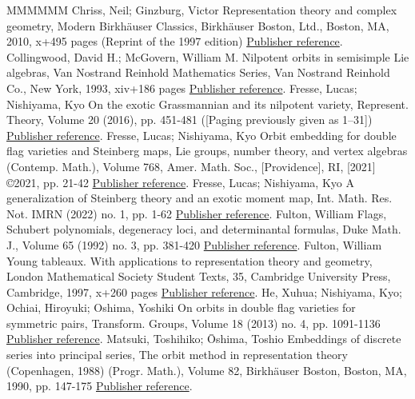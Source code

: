 \begin{thebibliography}{MMMMMM}
 Chriss, Neil; Ginzburg, Victor Representation theory and complex geometry, Modern Birkhäuser Classics, Birkhäuser Boston, Ltd., Boston, MA, 2010, x+495 pages (Reprint of the 1997 edition) \href{https://alco.centre-mersenne.org/articles/10.5802/alco.245/#CG}{Publisher reference}.
 Collingwood, David H.; McGovern, William M. Nilpotent orbits in semisimple Lie algebras, Van Nostrand Reinhold Mathematics Series, Van Nostrand Reinhold Co., New York, 1993, xiv+186 pages \href{https://alco.centre-mersenne.org/articles/10.5802/alco.245/#Collingwood-McGovern}{Publisher reference}.
 Fresse, Lucas; Nishiyama, Kyo On the exotic Grassmannian and its nilpotent variety, Represent. Theory, Volume 20 (2016), pp. 451-481 ([Paging previously given as 1–31]) \href{https://alco.centre-mersenne.org/articles/10.5802/alco.245/#FN1}{Publisher reference}.
 Fresse, Lucas; Nishiyama, Kyo Orbit embedding for double flag varieties and Steinberg maps, Lie groups, number theory, and vertex algebras (Contemp. Math.), Volume 768, Amer. Math. Soc., [Providence], RI, [2021] ©2021, pp. 21-42 \href{https://alco.centre-mersenne.org/articles/10.5802/alco.245/#FN3}{Publisher reference}.
 Fresse, Lucas; Nishiyama, Kyo A generalization of Steinberg theory and an exotic moment map, Int. Math. Res. Not. IMRN (2022) no. 1, pp. 1-62 \href{https://alco.centre-mersenne.org/articles/10.5802/alco.245/#FN2}{Publisher reference}.
 Fulton, William Flags, Schubert polynomials, degeneracy loci, and determinantal formulas, Duke Math. J., Volume 65 (1992) no. 3, pp. 381-420 \href{https://alco.centre-mersenne.org/articles/10.5802/alco.245/#Fulton-1991}{Publisher reference}.
 Fulton, William Young tableaux. With applications to representation theory and geometry, London Mathematical Society Student Texts, 35, Cambridge University Press, Cambridge, 1997, x+260 pages \href{https://alco.centre-mersenne.org/articles/10.5802/alco.245/#Fulton}{Publisher reference}.
 He, Xuhua; Nishiyama, Kyo; Ochiai, Hiroyuki; Oshima, Yoshiki On orbits in double flag varieties for symmetric pairs, Transform. Groups, Volume 18 (2013) no. 4, pp. 1091-1136 \href{https://alco.centre-mersenne.org/articles/10.5802/alco.245/#HNOO}{Publisher reference}.
 Matsuki, Toshihiko; Ōshima, Toshio Embeddings of discrete series into principal series, The orbit method in representation theory (Copenhagen, 1988) (Progr. Math.), Volume 82, Birkhäuser Boston, Boston, MA, 1990, pp. 147-175 \href{https://alco.centre-mersenne.org/articles/10.5802/alco.245/#Matsuki-Oshima}{Publisher reference}.

\end{thebibliography}
